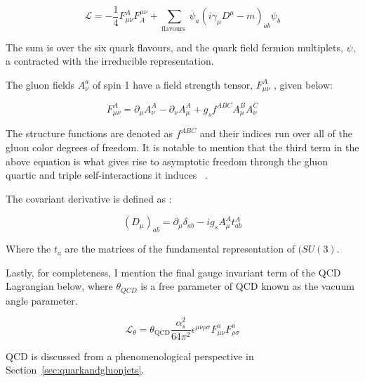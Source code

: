 \begin{equation}
\mathcal{L}=-\frac{1}{4} F_{\mu \nu}^{A} F_{A}^{\mu \nu}+\sum_{\text {flavours }} \overline{\psi}_{a}\left(i \gamma_{\mu} D^{\mu}-m\right)_{a b} \psi_{b}
\end{equation}


The sum is over the six quark flavours, and the quark field fermion multiplets, $\psi$, a contracted with the irreducible representation.~\cite{Crewther:1995wq}

The gluon fields $A_{\nu}^a$ of spin 1 have a field strength tensor, $F_{\mu \nu}^{A}$ , given below:\newline 

\begin{equation}
F_{\mu \nu}^{A}=\partial_{\mu} A_{\nu}^{A}-\partial_{\nu} A_{\mu}^{A}+g_{s} f^{A B C} A_{\mu}^{B} A_{\nu}^{C}
\end{equation}


The structure functions are denoted as $f^{A B C}$ and their indices run over all of the gluon color degrees of freedom. It is notable to mention that the third term in the above equation is what gives rise to asymptotic freedom through the gluon quartic and triple self-interactions it induces ~\cite{Crewther:1995wq}.

The covariant derivative is defined as :\newline

\begin{equation}
\left(D_{\mu}\right)_{a b}=\partial_{\mu} \delta_{a b}-i g_{s} A_{\mu}^{A} t_{a b}^{A}
\end{equation}

Where the $t_{a}$ are the matrices of the fundamental representation of $(SU(3)$.

Lastly, for completeness, I mention the final gauge invariant term of the QCD Lagrangian below, where $\theta_{QCD}$ is a free parameter of QCD known as the vacuum angle parameter.

\begin{equation}
\mathcal{L}_{\theta}=\theta_{\mathrm{QCD}} \frac{\alpha_{s}^{2}}{64 \pi^{2}} \epsilon^{\mu \nu \rho \sigma} F_{\mu \nu}^{a} F_{\rho \sigma}^{a}
\end{equation}


QCD is discussed from a phenomenological perspective in Section~\ref{sec:quarkandgluonjets}. 














